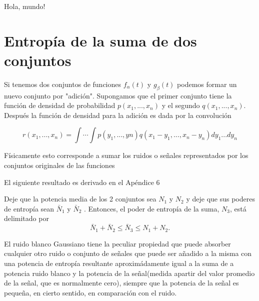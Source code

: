 {\textexclamdown}Hola, mundo!

\section{Entrop\'ia de la suma de dos conjuntos}

	Si tenemos dos conjuntos de funciones $f_{\alpha}(t)$ y
	$g_{\beta}(t)$ podemos formar un nuevo conjunto por
	"adici\'on". Supongamos que el primer conjunto tiene la
	funci\'on de densidad de probabilidad $p(x_{1},...,x_{n})$ y
	el segundo $q(x_{1},...,x_{n})$.  Despu\'es la funci\'on de
	densidad para la adici\'on es dada por la convoluci\'on
	
	\begin{equation} r(x_{1},...,x_{n}) = \int \cdots \int
		p(y_{1},...,y{n})q(x_{1}-y_{1},...,x_{n}-y_{n})dy_{1}...dy_{n} \end{equation}
	
	F\'isicamente esto corresponde a sumar los ruidos o se\~nales
	representados por los conjuntos originales de las funciones
	
		
	El siguiente resultado es derivado en el Ap\'endice 6
	
    \begin{theorem} Deje que la potencia media de los 2 conjuntos sea
    $N_{1}$ y $N_{2}$ y deje que sus poderes de entrop\'ia sean
    $\bar{N}_1$ y $\bar{N}_2$ . Entonces, el poder de entrop\'ia de
    la suma, $N_{3}$, est\'a delimitado
    por \begin{equation} \bar{N}_1+\bar{N}_2 \le \bar{N}_3 \le
    N_{1}+N_{2}.  \end{equation} \end{theorem}
	
	El ruido blanco Gaussiano tiene la peculiar propiedad que
	puede absorber cualquier otro ruido o conjunto de se\~nales
	que puede ser a\~nadido a la misma con una potencia de
	entrop\'ia resultante aproxim\'adamente igual a la suma de a
	potencia ruido blanco y la potencia de la se\~nal(medida
	apartir del valor promedio de la se\~nal, que es normalmente
	cero), siempre que la potencia de la señal es peque\~na, en
	cierto sentido, en comparaci\'on con el ruido.
	
